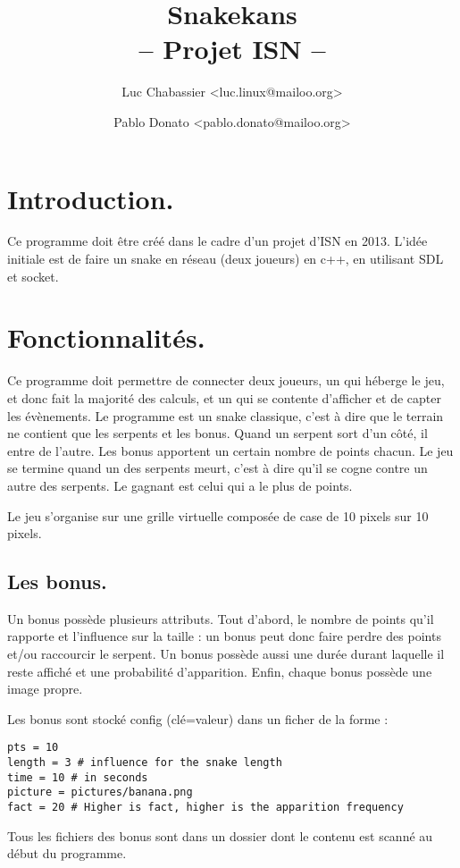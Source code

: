 \documentclass{article}
\title{Snakekans\\-- Projet ISN --}
\author{Luc Chabassier <luc.linux@mailoo.org> \and Pablo Donato <pablo.donato@mailoo.org>}
\begin{document}
\maketitle

\tableofcontents

\section{Introduction.}
Ce programme doit être créé dans le cadre d'un projet d'ISN en 2013. L'idée initiale est de faire un snake en réseau (deux joueurs) en c++, en utilisant SDL et socket.

\section{Fonctionnalités.}
Ce programme doit permettre de connecter deux joueurs, un qui héberge le jeu, et donc fait la majorité des calculs, et un qui se contente d'afficher et de capter les évènements. Le programme est un snake classique, c'est à dire que le terrain ne contient que les serpents et les bonus. Quand un serpent sort d'un côté, il entre de l'autre. Les bonus apportent un certain nombre de points chacun. Le jeu se termine quand un des serpents meurt, c'est à dire qu'il se cogne contre un autre des serpents. Le gagnant est celui qui a le plus de points.

Le jeu s'organise sur une grille virtuelle composée de case de 10 pixels sur 10 pixels.

\subsection{Les bonus.}
Un bonus possède plusieurs attributs. Tout d'abord, le nombre de points qu'il rapporte et l'influence sur la taille : un bonus peut donc faire perdre des points et/ou raccourcir le serpent. Un bonus possède aussi une durée durant laquelle il reste affiché et une probabilité d'apparition. Enfin, chaque bonus possède une image propre.

Les bonus sont stocké config (clé=valeur) dans un ficher de la forme :
\begin{verbatim}
pts = 10
length = 3 # influence for the snake length
time = 10 # in seconds
picture = pictures/banana.png
fact = 20 # Higher is fact, higher is the apparition frequency
\end{verbatim}

Tous les fichiers des bonus sont dans un dossier dont le contenu est scanné au début du programme.
\end{document}
